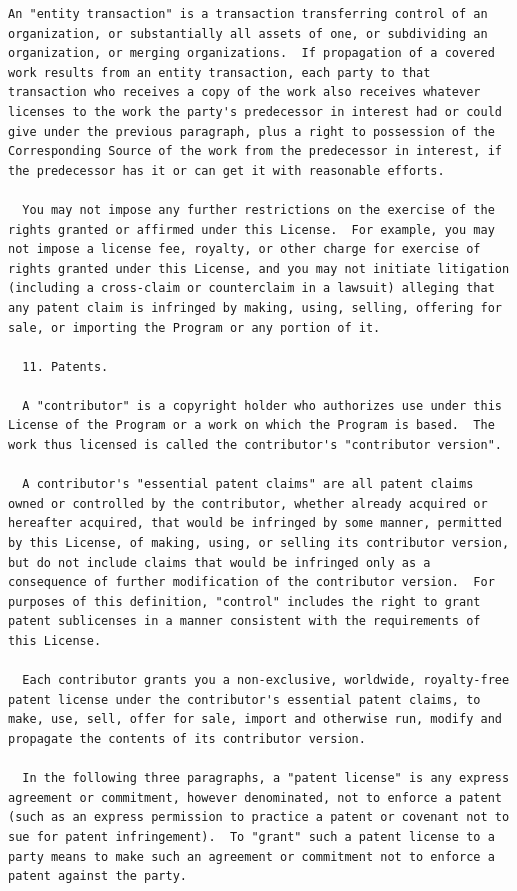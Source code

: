 \documentclass[letterpaper,10pt,english]{sphinxmanual}
\begin{document}
\begin{Verbatim}[commandchars=\\\{\}]
  An "entity transaction" is a transaction transferring control of an
organization, or substantially all assets of one, or subdividing an
organization, or merging organizations.  If propagation of a covered
work results from an entity transaction, each party to that
transaction who receives a copy of the work also receives whatever
licenses to the work the party's predecessor in interest had or could
give under the previous paragraph, plus a right to possession of the
Corresponding Source of the work from the predecessor in interest, if
the predecessor has it or can get it with reasonable efforts.

  You may not impose any further restrictions on the exercise of the
rights granted or affirmed under this License.  For example, you may
not impose a license fee, royalty, or other charge for exercise of
rights granted under this License, and you may not initiate litigation
(including a cross-claim or counterclaim in a lawsuit) alleging that
any patent claim is infringed by making, using, selling, offering for
sale, or importing the Program or any portion of it.

  11. Patents.

  A "contributor" is a copyright holder who authorizes use under this
License of the Program or a work on which the Program is based.  The
work thus licensed is called the contributor's "contributor version".

  A contributor's "essential patent claims" are all patent claims
owned or controlled by the contributor, whether already acquired or
hereafter acquired, that would be infringed by some manner, permitted
by this License, of making, using, or selling its contributor version,
but do not include claims that would be infringed only as a
consequence of further modification of the contributor version.  For
purposes of this definition, "control" includes the right to grant
patent sublicenses in a manner consistent with the requirements of
this License.

  Each contributor grants you a non-exclusive, worldwide, royalty-free
patent license under the contributor's essential patent claims, to
make, use, sell, offer for sale, import and otherwise run, modify and
propagate the contents of its contributor version.

  In the following three paragraphs, a "patent license" is any express
agreement or commitment, however denominated, not to enforce a patent
(such as an express permission to practice a patent or covenant not to
sue for patent infringement).  To "grant" such a patent license to a
party means to make such an agreement or commitment not to enforce a
patent against the party.


\end{Verbatim}
\end{document}
